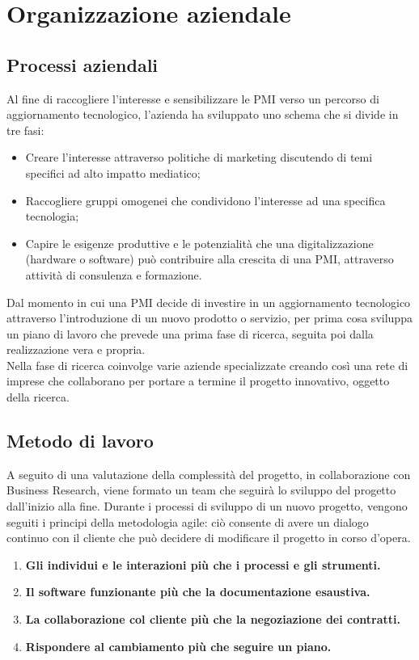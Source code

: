 \section{Organizzazione aziendale}

\subsection{Processi aziendali}
Al fine di raccogliere l'interesse e sensibilizzare le PMI verso un percorso di aggiornamento tecnologico, l'azienda ha sviluppato uno schema che si divide in tre fasi:
\begin{itemize}
\item Creare l'interesse attraverso politiche di marketing discutendo di temi specifici ad alto impatto mediatico;
\item Raccogliere gruppi omogenei che condividono l'interesse ad una specifica tecnologia;
\item Capire le esigenze produttive e le potenzialità che una digitalizzazione (hardware o software) può contribuire alla crescita di una PMI, attraverso attività di consulenza e formazione.
\end{itemize}
Dal momento in cui una PMI decide di investire in un aggiornamento tecnologico attraverso l'introduzione di un nuovo prodotto o servizio, \lab{} per prima cosa sviluppa un piano di lavoro che prevede una prima fase di ricerca, seguita poi dalla realizzazione vera e propria.\\
Nella fase di ricerca \lab{} coinvolge varie aziende specializzate creando così una rete di imprese che collaborano per portare a termine il progetto innovativo, oggetto della ricerca.

\subsection{Metodo di lavoro}
A seguito di una valutazione della complessità del progetto, in collaborazione con Business Research, viene formato un team che seguirà lo sviluppo del progetto dall'inizio alla fine.
Durante i processi di sviluppo di un nuovo progetto, vengono seguiti i principi della metodologia agile: ciò consente di avere un dialogo continuo con il cliente che può decidere di modificare il progetto in corso d'opera.
\begin{enumerate}
\item \textbf{Gli individui e le interazioni più che i processi e gli strumenti.}
\item \textbf{Il software funzionante più che la documentazione esaustiva.}
\item \textbf{La collaborazione col cliente più che la negoziazione dei contratti.}
\item \textbf{Rispondere al cambiamento più che seguire un piano.}
\end{enumerate}

